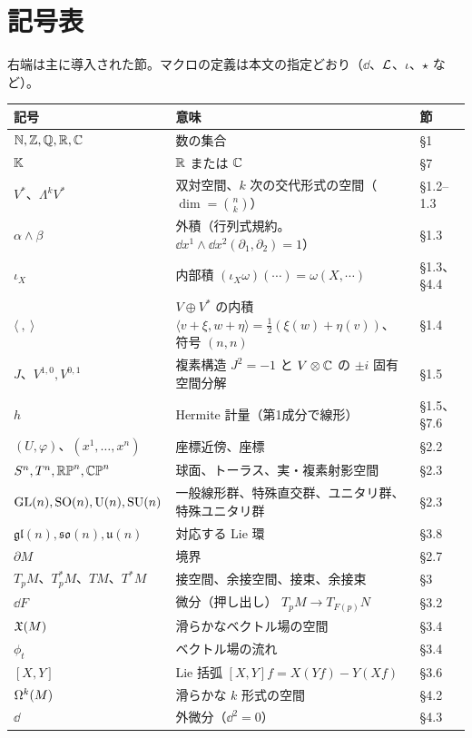 \section*{記号表}
右端は主に導入された節。マクロの定義は本文の指定どおり（$\dd$、$\mathcal L$、$\iota$、$\star$ など）。
\begingroup\small
\renewcommand{\arraystretch}{1.22}
\begin{longtable}{@{}p{4.7cm}p{8.0cm}>{\raggedright\arraybackslash}p{2.1cm}@{}}
\toprule
記号 & 意味 & 節 \\
\midrule
\endhead
$\mathbb N,\mathbb Z,\mathbb Q,\mathbb R,\mathbb C$ & 数の集合 & §1 \\
$\mathbb K$ & $\mathbb R$ または $\mathbb C$ & §7 \\
$V^*$、$\Lambda^kV^*$ & 双対空間、$k$ 次の交代形式の空間（$\dim=\binom nk$） & §1.2--1.3 \\
$\alpha\wedge\beta$ & 外積（行列式規約。$\dd x^1\wedge\dd x^2(\partial_1,\partial_2)=1$） & §1.3 \\
$\iota_X$ & 内部積 $(\iota_X\omega)(\cdots)=\omega(X,\cdots)$ & §1.3、§4.4 \\
$\langle\ ,\ \rangle$ & $V\oplus V^*$ の内積 $\langle v+\xi,w+\eta\rangle=\frac12(\xi(w)+\eta(v))$、符号 $(n,n)$ & §1.4 \\
$J$、$V^{1,0},V^{0,1}$ & 複素構造 $J^2=-1$ と $V\otimes\mathbb C$ の $\pm i$ 固有空間分解 & §1.5 \\
$h$ & Hermite 計量（第1成分で線形） & §1.5、§7.6 \\
$(U,\varphi)$、$(x^1,\dots,x^n)$ & 座標近傍、座標 & §2.2 \\
$S^n,T^n,\mathbb{RP}^n,\mathbb{CP}^n$ & 球面、トーラス、実・複素射影空間 & §2.3 \\
$\mathrm{GL}(n),\mathrm{SO}(n),\mathrm{U}(n),\mathrm{SU}(n)$ & 一般線形群、特殊直交群、ユニタリ群、特殊ユニタリ群 & §2.3 \\
$\mathfrak{gl}(n),\mathfrak{so}(n),\mathfrak u(n)$ & 対応する Lie 環 & §3.8 \\
$\partial M$ & 境界 & §2.7 \\
$T_pM$、$T_p^*M$、$TM$、$T^*M$ & 接空間、余接空間、接束、余接束 & §3 \\
$\dd F$ & 微分（押し出し） $T_pM\to T_{F(p)}N$ & §3.2 \\
$\mathfrak X(M)$ & 滑らかなベクトル場の空間 & §3.4 \\
$\phi_t$ & ベクトル場の流れ & §3.4 \\
$[X,Y]$ & Lie 括弧 $[X,Y]f=X(Yf)-Y(Xf)$ & §3.6 \\
$\Omega^k(M)$ & 滑らかな $k$ 形式の空間 & §4.2 \\
$\dd$ & 外微分（$\dd^2=0$） & §4.3 \\

\end{longtable}
